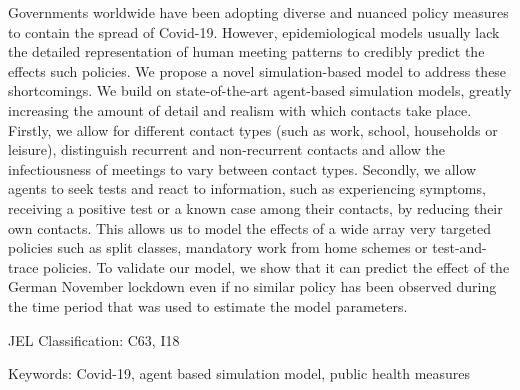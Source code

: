 \noindent
Governments worldwide have been adopting diverse and nuanced policy measures
to contain the spread of Covid-19.
However, epidemiological models usually lack the detailed representation of
human meeting patterns to credibly predict the effects such policies.
%
We propose a novel simulation-based model to address these shortcomings.
We build on state-of-the-art agent-based simulation models, greatly increasing
the amount of detail and realism with which contacts take place.
Firstly, we allow for different contact types (such as work, school, households
or leisure), distinguish recurrent and non-recurrent contacts and allow the
infectiousness of meetings to vary between contact types.
Secondly, we allow agents to seek tests and react to information, such as
experiencing symptoms, receiving a positive test or a known case among their
contacts, by reducing their own contacts.
This allows us to model the effects of a wide array very targeted policies such
as split classes, mandatory work from home schemes or test-and-trace policies.
To validate our model, we show that it can predict the effect of the German
November lockdown even if no similar policy has been observed during the time
period that was used to estimate the model parameters.


\vspace{1cm}
\noindent JEL Classification: C63, I18

\noindent Keywords: Covid-19, agent based simulation model, public health measures
